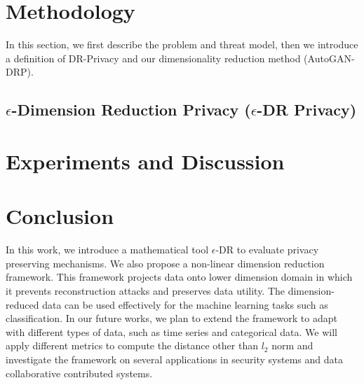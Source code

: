 \section{Methodology} \label{sec:autogan_methodology}

In this section, we first describe the problem and threat model, then we introduce a definition of DR-Privacy and our dimensionality reduction method (AutoGAN-DRP).    


\subsection{$\epsilon$-Dimension Reduction Privacy ($\epsilon$-DR Privacy)} \label{sec:theory}




\section{Experiments and Discussion}
\label{sec:experimentsanddiscussion}


\section{Conclusion}
\label{sec:Autogan_conclusion}
In this work, we introduce a mathematical tool $\epsilon$-DR to evaluate privacy preserving mechanisms. We also propose a non-linear dimension reduction framework. This framework projects data onto lower dimension domain in which it prevents reconstruction attacks and preserves data utility. The dimension-reduced data can be used effectively for the machine learning tasks such as classification. In our future works, we plan to extend the framework to adapt with different types of data, such as time series and categorical data. We will apply different metrics to compute the distance other than $l_2$ norm and investigate the framework on several applications in security systems and data collaborative contributed systems.  





